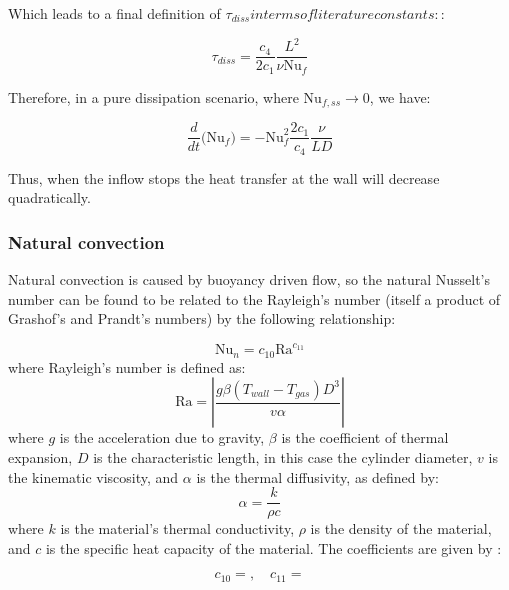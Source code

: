 \noindent Which leads to a final definition of $\tau_{diss} in terms of literature constants:$:

\begin{equation}
\tau_{diss} = \frac{c_4}{2c_1}  \frac{L^2}{\nu \text{Nu}_f}
\end{equation}

\noindent Therefore, in a pure dissipation scenario, where $\text{Nu}_{f,ss} \rightarrow 0$, we have:

\begin{equation}
\frac{d}{dt}\Big(\text{Nu}_f \Big) = -\text{Nu}_f^2  \frac{2c_1}{c_4}\frac{\nu}{LD}
\end{equation}

\noindent Thus, when the inflow stops the heat transfer at the wall will decrease quadratically.

\subsubsection{Natural convection}
\label{sec:naturalConvection}

Natural convection is caused by buoyancy driven flow, so the natural Nusselt's number can be found to be related to the Rayleigh's number (itself a product of Grashof's and Prandt's numbers) by the following relationship:

\begin{equation}
\text{Nu}_n  = c_{10} \text{Ra}^{c_{11}}
\end{equation}
where Rayleigh's number is defined as:
\begin{equation}
\text{Ra} = \left| \frac{g\beta\left(T_{wall} - T_{gas} \right) D^3}{v\alpha}\right|
\end{equation}
where $g$ is the acceleration due to gravity, $\beta$ is the coefficient of thermal expansion, $D$ is the characteristic length, in this case the cylinder diameter, $v$ is the kinematic viscosity, and $\alpha$ is the thermal diffusivity, as defined by:
\begin{equation}
\label{equ:thermalDiffusivity}
\alpha = \frac{k}{\rho c}
\end{equation}
where $k$ is the material's thermal conductivity, $\rho$ is the density of the material, and $c$ is the specific heat capacity of the material. The coefficients are given by :

\begin{equation}
c_{10} =   ,  \quad c_{11} = 
\end{equation}



